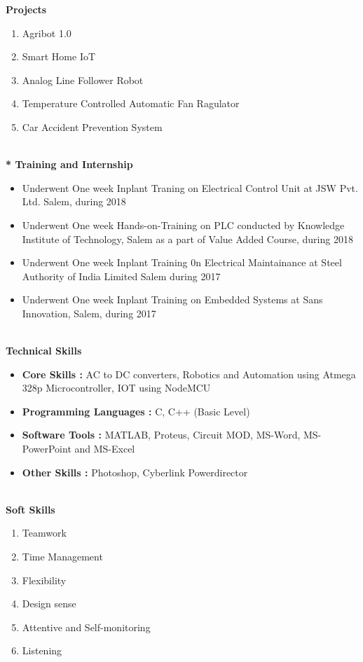 \documentclass{article}
\begin{document}
	\begin{flushleft}
		\Large \textbf{Projects}
		\begin{enumerate}
			\item Agribot 1.0
			\item Smart Home IoT
			\item Analog Line Follower Robot
			\item Temperature Controlled Automatic Fan Ragulator
			\item Car Accident Prevention System
		\end{enumerate}
		
		\Large \textbf{\\* Training and Internship}\
		
		\begin{itemize}
			\item Underwent One week Inplant Traning on Electrical Control Unit at JSW Pvt. Ltd. Salem, during 2018
			\item Underwent One week Hands-on-Training on PLC conducted by Knowledge Institute of Technology, Salem as a part of Value Added Course, during 2018 
			\item Underwent One week Inplant Training 0n Electrical Maintainance at Steel Authority of India Limited Salem during 2017
			\item Underwent One week Inplant Training on Embedded Systems at Sans Innovation, Salem, during 2017 
		\end{itemize}
		
		\Large \textbf{\\Technical Skills}\
		\begin{itemize}
			\item \textbf{Core Skills	:} AC to DC converters,	Robotics and Automation using Atmega 328p Microcontroller, IOT using NodeMCU
			\item \textbf{Programming Languages	:}	C, C++ (Basic Level)
			\item \textbf{Software Tools	:}	MATLAB, Proteus, Circuit MOD, MS-Word, MS-PowerPoint and MS-Excel
			\item \textbf{Other Skills	:} Photoshop, Cyberlink Powerdirector
		\end{itemize}
		
		\Large \textbf{\\Soft Skills}\
		\begin{enumerate}
			\item Teamwork
			\item Time Management
			\item Flexibility
			\item Design sense
			\item Attentive and Self-monitoring
			\item Listening
		\end{enumerate}
		

\end{flushleft}
\end{document}
